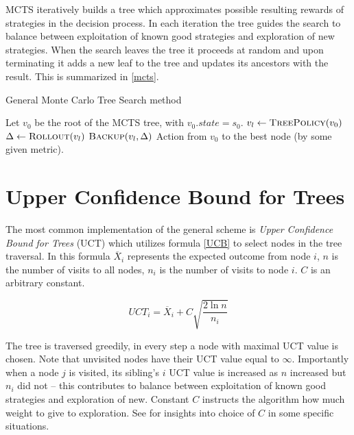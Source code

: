 MCTS iteratively builds a tree which approximates possible resulting
rewards of strategies in the decision process. In each iteration the
tree guides the search to balance between exploitation of known good
strategies and exploration of new strategies. When the search leaves the
tree it proceeds at random and upon terminating it adds a new leaf to
the tree and updates its ancestors with the result. This is summarized
in \autoref{mcts}.


\begin{algorithm}
\caption{General Monte Carlo Tree Search method}
\label{mcts}
\begin{algorithmic}
    \State Let $v_0$ be the root of the MCTS tree, with $v_0.state = s_0$.
        \State $v_l \gets \Call{TreePolicy}{v_0}$
        \State $\Delta \gets \Call{Rollout}{v_l}$
        \State $\Call{Backup}{v_l, \Delta}$
    \EndWhile
    \State \Return Action from $v_0$ to the best node (by some
    given metric).
\EndFunction
\end{algorithmic}
\end{algorithm}

\section{Upper Confidence Bound for Trees}

The most common implementation of the general scheme is {\em Upper
Confidence Bound for Trees} (UCT) which utilizes formula \ref{UCB} to
select nodes in the tree traversal.
In this formula $\overline{X}_i$ represents the expected outcome
from node $i$, $n$ is the number of visits to all nodes, $n_i$ is the
number of visits to node $i$. $C$ is an arbitrary constant.

\begin{equation}
\label{UCB}
UCT_i = \overline{X}_i + C \sqrt{ \frac{2 \ln n}{n_i} }
\end{equation}

The tree is traversed greedily, in every step a node with maximal UCT
value is chosen. Note that unvisited nodes have their UCT value equal to $\infty$.
Importantly when a node $j$ is visited, its sibling's $i$ UCT value is
increased as $n$ increased but $n_i$ did not -- this contributes to
balance between exploitation of known good strategies and exploration of new.
Constant $C$ instructs the algorithm how much weight to give to
exploration. See \parencite{improved_mc} for insights into choice of $C$
in some specific situations.

